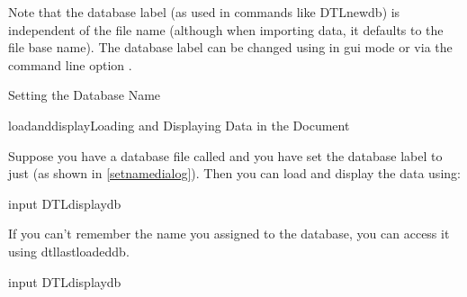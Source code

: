 Note that the database label (as used in commands like \gls{DTLnewdb})
is independent of the file name (although when importing data, it defaults 
to the file base name).  The database label can be changed using 
 in 
\gls{gui} mode or via the command line option 
.

{
}
{Setting the Database Name}

\begin{example}{loadanddisplay}{Loading and Displaying Data in the
Document}

Suppose you have a database file called 
and you have set the database label to just 
(as shown in \autoref{setnamedialog}).
Then you can load and display the data using:
\begin{codebox}
\codepar
\gls{input}
\codepar
{}
\gls{DTLdisplaydb}
\end{codebox}

If you can't remember the name you assigned to the database, you can 
access it using \gls{dtllastloadeddb}.
\begin{codebox}
\codepar
\gls{input}
\codepar
{}
\gls{DTLdisplaydb}
\end{codebox}


\end{example}
